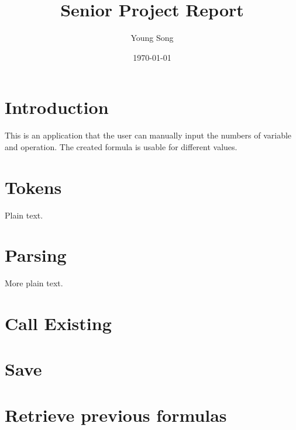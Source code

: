 \documentclass{article}
\title{Senior Project Report}
\author{Young Song}
\date{\today}
\begin{document}
\maketitle

\begin{comment}
\begin{titlepage}
   \vspace*{\stretch{1.0}}
   \begin{center}
      \Large\textbf{Senior Project Report}\\[2in]
      \large\textit{Young Song}\\[2in]
      \large\textit{Cal Poly Pomona}
   \end{center}
   \vspace*{\stretch{2.0}}
\end{titlepage}
\end{comment}

\section{Introduction}
This is an application that the user can manually input the numbers of variable
and operation. The created formula is usable for different values.
\section{Tokens}

Plain text.

\section{Parsing}

More plain text.
\section{Call Existing}
\section{Save}
\section{Retrieve previous formulas}
\end{document}
